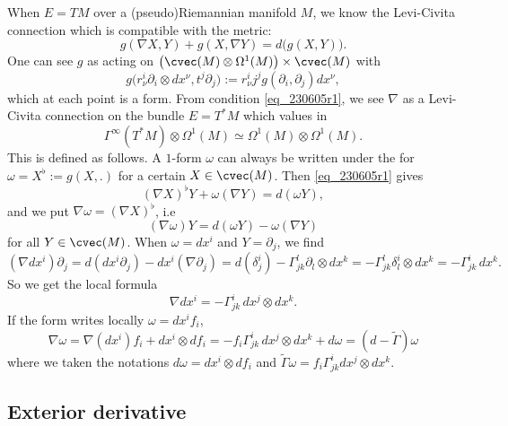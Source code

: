 When $E=TM$ over a (pseudo)Riemannian manifold $M$, we know the Levi-Civita connection which is compatible with the metric:
\begin{equation}\label{eq_230605r1}
  g(\nabla X,Y)+g(X,\nabla Y)=d\big( g(X,Y) \big).
\end{equation}
One can see $g$ as acting on $\big( \cvec(M)\otimes\Omega^1(M) \big)\times\cvec(M)$ with
\[ 
 g\big( r^i_{\nu}\partial_i\otimes dx^{\nu},t^j\partial_j \big):=r^i_{\nu}j^jg(\partial_i,\partial_j)dx^{\nu}, 
\]
which at each point is a form. From condition \eqref{eq_230605r1}, we see $\nabla$ as a Levi-Civita connection on the bundle $E=T^*M$ which values in 
\[ 
 \Gamma^{\infty}(T^*M)\otimes\Omega^1(M)\simeq\Omega^1(M)\otimes\Omega^1(M).
\]
This is defined as follows. A $1$-form $\omega$ can always be written under the for $\omega=X^{\flat}:=g(X,.)$ for a certain $X\in\cvec(M)$. Then  \eqref{eq_230605r1} gives
\[ 
  (\nabla X)^{\flat}Y+\omega(\nabla Y)=d(\omega Y),
\]
and we put $\nabla\omega=(\nabla X)^{\flat}$, i.e
\begin{equation}
  (\nabla\omega)Y=d(\omega Y)-\omega(\nabla Y)
\end{equation}
for all $Y\in\cvec(M)$. When $\omega=dx^i$ and $Y=\partial_j$, we find
\begin{equation}
(\nabla dx^i)\partial_j=d(dx^i\partial_j)-dx^i(\nabla\partial_j)
		=d(\delta^i_j)-\Gamma_{jk}^{l}\partial_l\otimes dx^k
		=-\Gamma_{jk}^{l}\delta_l^i\otimes dx^k
		=-\Gamma_{jk}^{i}\,dx^k.
\end{equation}
So we get the local formula
\begin{equation}
\nabla dx^i=-\Gamma_{jk}^{i}\,dx^j\otimes dx^k.
\end{equation}
If the form writes locally $\omega=dx^if_i$,
\begin{equation}
  \nabla\omega=\nabla(dx^i)f_i+dx^i\otimes df_i
		=-f_i\Gamma_{jk}^{i}\,dx^j\otimes dx^k+d\omega
		=(d-\tilde\Gamma)\omega
\end{equation}
where we taken the notations $d\omega=dx^i\otimes df_i$ and $\tilde\Gamma\omega=f_i\Gamma_{jk}^{i}dx^j\otimes dx^k$.

\subsection{Exterior derivative}

